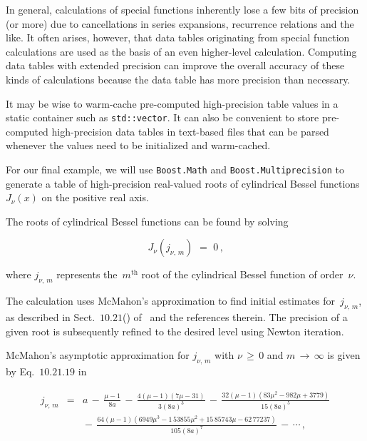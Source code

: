 \documentclass{article}[10pt]
\begin{document}
In general, calculations of special functions inherently
lose a few bits of precision (or more)
due to cancellations in series expansions,
recurrence relations and the like. It often arises, however,
that data tables originating from
special function calculations are used as the basis
of an even higher-level calculation. Computing data tables
with extended precision can improve the overall accuracy of
these kinds of calculations because the data table
has more precision than necessary.

It may be wise to warm-cache pre-computed high-precision
table values in a static container such as \lstinline|std::vector|.
It can also be convenient to store pre-computed high-precision
data tables in text-based files that can be parsed whenever
the values need to be initialized and warm-cached.

For our final example, we will use \lstinline|Boost.Math| and
\lstinline|Boost.Multiprecision| to generate a table of
high-precision real-valued roots of
cylindrical Bessel functions $J_{\nu}(x)$ on the
positive real axis.

The roots of cylindrical Bessel functions can be found
by solving

\begin{equation}
J_{\nu}\left(j_{\nu,\,m}\right)
\,\,=\,\,
0
\,{\text{,}}
\end{equation}

\noindent
where $j_{\nu,\,m}$ represents the~$m^{\text{th}}$
root of the cylindrical Bessel function of order~$\nu$.

The calculation uses McMahon's approximation to find
initial estimates for~$j_{\nu,\,m}$,
as described in Sect.~$10$.$21$({})
of~\cite{bibitem:nisthandbook} and the references therein.
The precision of a given root is subsequently
refined to the desired level using Newton iteration.

McMahon's asymptotic approximation for $j_{\nu,\,m}$
with $\nu\,\ge\,0$ and $m\,\rightarrow\,\infty$
is given by Eq.~$10$.$21$.$19$ in~\cite{bibitem:nisthandbook}

\begin{eqnarray}
j_{\nu,\,m}
& = &
a
\,-\,
\frac{\mu - 1}{8a}
\,-\,
\frac{4(\mu - 1)(7\mu -31)}{3(8a)^3}
\,-\,
\frac{32(\mu - 1)(83\mu^2 - 982\mu +3779)}{15(8a)^5}
\nonumber \\
&&
\!\!\!\!\!\!\!\! - \,
\frac{64(\mu - 1)(6949\mu^3 - 1\,53855\mu^2 + 15\,85743\mu - 62\,77237)}{105(8a)^7}
\,-\,\cdots
\,{\text{,}}
\label{equation:mcmahon}
\end{eqnarray}
\end{document}

